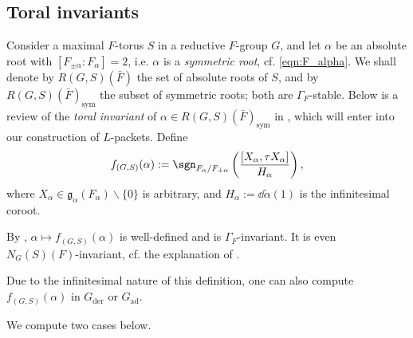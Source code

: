 \documentclass[a4paper,10pt]{article}
\begin{document}
\subsection{Toral invariants}\label{sec:toral-invariants}
Consider a maximal $F$-torus $S$ in a reductive $F$-group $G$, and let $\alpha$ be an absolute root with $[F_{\pm\alpha} : F_\alpha] = 2$, i.e. $\alpha$ is a \emph{symmetric root}, cf. \eqref{eqn:F_alpha}. We shall denote by $R(G,S)(\bar{F})$ the set of absolute roots of $S$, and by $R(G,S)(\bar{F})_\text{sym}$ the subset of symmetric roots; both are $\Gamma_F$-stable. Below is a review of the \emph{toral invariant} of $\alpha \in R(G,S)(\bar{F})_\text{sym}$ in \cite[\S 4.1]{Kal15}, which will enter into our construction of $L$-packets. Define
\[ f_{(G,S)}(\alpha) := \sgn_{F_\alpha/F_{\pm\alpha}}\left( \dfrac{[X_\alpha, \tau X_\alpha]}{H_\alpha} \right), \]
where $X_\alpha \in \mathfrak{g}_\alpha(F_\alpha) \smallsetminus \{0\}$ is arbitrary, and $H_\alpha := \dd\check{\alpha}(1)$ is the infinitesimal coroot. 
\begin{compactitem}
	\item By \cite[Fact 4.1]{Kal15}, $\alpha \mapsto f_{(G,S)}(\alpha)$ is well-defined and is $\Gamma_F$-invariant. It is even $N_G(S)(F)$-invariant, cf. the explanation of \cite[Fact 4.7.4]{Kal16}.
	\item Due to the infinitesimal nature of this definition, one can also compute $f_{(G,S)}(\alpha)$ in $G_\text{der}$ or $G_\text{ad}$.
\end{compactitem}
We compute two cases below.
\end{document}
